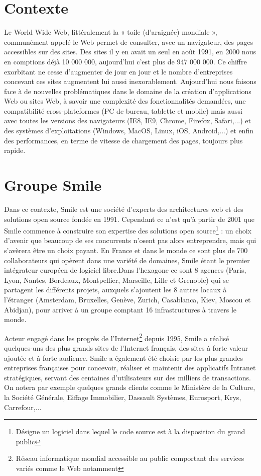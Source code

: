 \documentclass[a4paper,11pt,twoside]{report}
\begin{document}
  \section{Contexte}
  Le World Wide Web, littéralement la « toile (d’araignée) mondiale », communément appelé le Web permet de consulter, avec un navigateur, des pages accessibles sur des sites. Des sites il y en avait un seul en août 1991, en 2000 nous en comptions déjà 10 000 000, aujourd'hui c'est plus de 947 000 000. Ce chiffre exorbitant ne cesse d'augmenter de jour en jour et le nombre d'entreprises concevant ces sites augmentent lui aussi inexorablement. Aujourd'hui nous faisons face à de nouvelles problématiques dans le domaine de la création d'applications Web ou sites Web, à savoir une complexité des fonctionnalités demandées, une compatibilité cross-plateformes (PC de bureau, tablette et mobile) mais aussi avec toutes les versions des navigateurs (IE8, IE9, Chrome, Firefox, Safari,...) et des systèmes d'exploitations (Windows, MacOS, Linux, iOS, Android,...) et enfin des performances, en terme de vitesse de chargement des pages, toujours plus rapide.
  
  \section{Groupe Smile}
  Dans ce contexte, Smile est une société d'experts des architectures web et des solutions open source fondée en 1991. Cependant ce n'est qu'à partir de 2001 que Smile commence à construire son expertise des solutions open source\footnote{Désigne un logiciel dans lequel le code source est à la disposition du grand public} : un choix d’avenir que beaucoup de ses concurrents n’osent pas alors entreprendre, mais qui s'avèrera être un choix payant. En France et dans le monde ce sont plus de 700 collaborateurs qui opèrent dans une variété de domaines, Smile étant le premier intégrateur européen de logiciel libre.Dans l'hexagone ce sont 8 agences (Paris, Lyon, Nantes, Bordeaux, Montpellier, Marseille, Lille et Grenoble) qui se partagent les différents projets, auxquels s'ajoutent les 8 autres locaux à l'étranger (Amsterdam, Bruxelles, Genève, Zurich, Casablanca, Kiev, Moscou et Abidjan), pour arriver à un groupe comptant 16 infrastructures à travers le monde.\newline

  Acteur engagé dans les progrès de l’Internet\footnote{Réseau informatique mondial accessible au public comportant des services variés comme le Web notamment} depuis 1995, Smile a réalisé quelques-uns des plus grands sites de l'Internet français, des sites à forte valeur ajoutée et à forte audience. Smile a également été choisie par les plus grandes entreprises françaises pour concevoir, réaliser et maintenir des applicatifs Intranet stratégiques, servant des centaines d'utilisateurs sur des milliers de transactions. On notera par exemple quelques grands clients comme le Ministère de la Culture, la Société Générale, Eiffage Immobilier, Dassault Systèmes, Eurosport, Krys, Carrefour,...\newline
  
\end{document}
